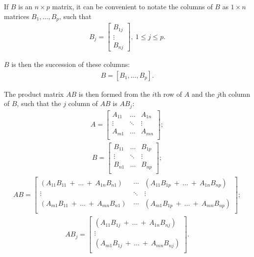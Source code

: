 \documentclass[12pt]{article}
\begin{document}
\begin{comm}
  If $B$ is an $n \times p$ matrix, it can be convenient to
  notate the columns of $B$ as $1 \times n$ matrices
  $B_1,\ldots,B_p$, such that
  \begin{align*}
    B_j =
    \begin{bmatrix}
      B_{1j}\\
      \vdots\\
      B_{nj}
    \end{bmatrix},\ 
    1 \leq j \leq p.
  \end{align*}

  $B$ is then the succession of these columns:
  \begin{align*}
    B = [B_1,\ldots,B_p].
  \end{align*}

  The product matrix $AB$ is then formed from the $i$th row of
  $A$ and the $j$th column of $B$, such that the $j$ column of
  $AB$ is $AB_j$:
  \begin{align*}
    A =
    \begin{bmatrix}
      A_{11} & \ldots & A_{1n}\\
      \vdots & \ddots & \vdots\\
      A_{m1} & \ldots & A_{mn}\\
    \end{bmatrix};
  \end{align*}
  \begin{align*}
    B =
    \begin{bmatrix}
      B_{11} & \ldots & B_{1p}\\
      \vdots & \ddots & \vdots\\
      B_{n1} & \ldots & B_{np}\\
    \end{bmatrix};
  \end{align*}
  \begin{align*}
    AB =
    \begin{bmatrix}
      (A_{11}B_{11}\ +\ \ldots\ +\ A_{1n}B_{n1})\
        & \cdots
        & (A_{11}B_{1p}\ +\ \ldots\ +\ A_{1n}B_{np})\\
      \vdots & \ddots & \vdots\\
      (A_{m1}B_{11}\ +\ \ldots\ +\ A_{mn}B_{n1})\
        & \cdots
        & (A_{m1}B_{1p}\ +\ \ldots\ +\ A_{mn}B_{np})\\
    \end{bmatrix};
  \end{align*}
  \begin{align*}
    AB_j =
    \begin{bmatrix}
      (A_{11}B_{1j}\ +\ \ldots\ +\ A_{1n}B_{nj})\\
      \vdots\\
      (A_{m1}B_{1j}\ +\ \ldots\ +\ A_{mn}B_{nj})\\
    \end{bmatrix}.
  \end{align*}
\end{comm}
\end{document}
